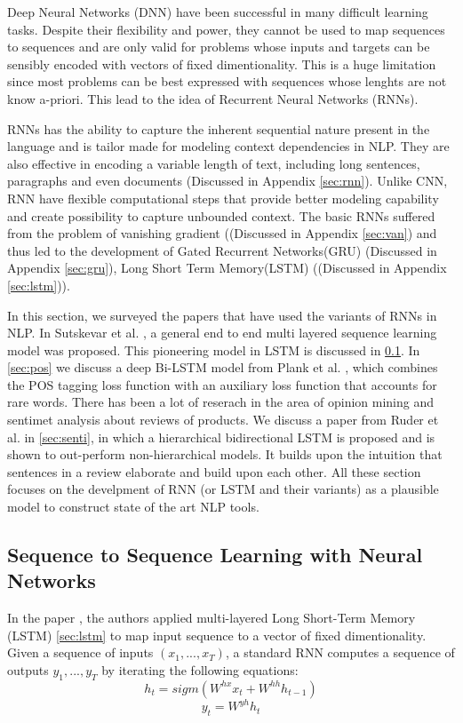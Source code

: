 \documentclass{article}
\begin{document}
	Deep Neural Networks (DNN) have been successful in many difficult learning tasks. Despite their flexibility and power, they cannot be used to map sequences to sequences and are only valid for problems whose inputs and targets can be sensibly encoded with vectors of fixed dimentionality. This is a huge limitation since most problems can be best expressed with sequences whose lenghts are not know a-priori. This lead to the idea of Recurrent Neural Networks (RNNs).
	
	RNNs has the ability to capture the inherent sequential nature present in the language and is tailor made for modeling context dependencies in NLP. They are also effective in encoding a variable length of text, including long sentences, paragraphs and even documents (Discussed in Appendix \ref{sec:rnn}). Unlike CNN, RNN have flexible computational steps that provide better modeling capability and create possibility to capture unbounded context. The basic RNNs suffered from the problem of vanishing gradient ((Discussed in Appendix \ref{sec:van}) and thus led to the development of Gated Recurrent Networks(GRU) (Discussed in Appendix \ref{sec:gru}), Long Short Term Memory(LSTM) ((Discussed in Appendix \ref{sec:lstm})).
	
	In this section, we surveyed the papers that have used the variants of RNNs in NLP. In Sutskevar et al. \cite{suts}, a general end to end multi layered sequence learning model was proposed. This pioneering model in LSTM is discussed in \ref{sec:suts}. In \ref{sec:pos} we discuss a deep Bi-LSTM model from Plank et al. \cite{pos}, which combines the POS tagging loss function with an auxiliary loss function that accounts for rare words. There has been a lot of reserach in the area of opinion mining and sentimet analysis about reviews of products. We discuss a paper from Ruder et al. in \ref{sec:senti}, in which a hierarchical bidirectional LSTM is proposed and is shown to out-perform non-hierarchical models. It builds upon the intuition that sentences in a review elaborate and build upon each other. All these section focuses on the develpment of RNN (or LSTM and their variants) as a plausible model to construct state of the art NLP tools. 

\subsection{Sequence to Sequence Learning with Neural Networks}
\label{sec:suts}
	
	In the paper \cite{suts}, the authors applied multi-layered Long Short-Term Memory (LSTM) \ref{sec:lstm} to map input sequence to a vector of fixed dimentionality. Given a sequence of inputs \((x_1, ... , x_T)\), a standard RNN computes a sequence of outputs \(y_1, ..., y_T\) by iterating the following equations:
	\[h_t = sigm(W^{hx} x_t + W^{hh} h_{t-1})\]
	\[y_t = W^{yh} h_t\]
	
\end{document}
